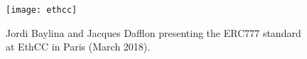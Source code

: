 \begin{figure}[!htbp]
\centering
\texttt{[image: ethcc]}
\caption[Presentation of the ERC777 standard at EthCC]{Jordi Baylina and Jacques Dafflon presenting the ERC777 standard at EthCC in Paris (March 2018)\footnotemark.}
\label{fig:ethcc}
\end{figure}

